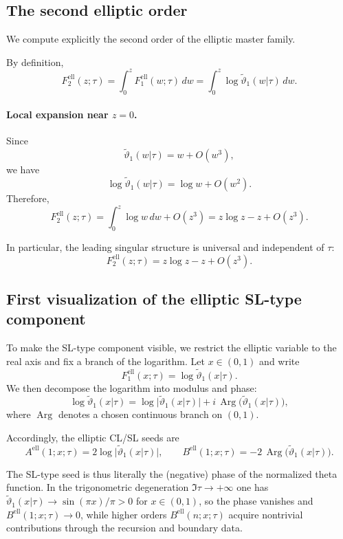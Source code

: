 \documentclass[11pt]{article}
\DeclareMathOperator{\Arg}{Arg}
\begin{document}
\subsection{The second elliptic order}

We compute explicitly the second order of the elliptic master family.

By definition,
\[
F^{\mathrm{ell}}_2(z;\tau)
=
\int_0^z F^{\mathrm{ell}}_1(w;\tau)\,dw
=
\int_0^z \log \widetilde{\vartheta}_1(w|\tau)\,dw.
\]

\paragraph{Local expansion near $z=0$.}
Since
\[
\widetilde{\vartheta}_1(w|\tau)
=
w + O(w^3),
\]
we have
\[
\log \widetilde{\vartheta}_1(w|\tau)
=
\log w + O(w^2).
\]
Therefore,
\[
F^{\mathrm{ell}}_2(z;\tau)
=
\int_0^z \log w\,dw + O(z^3)
=
z\log z - z + O(z^3).
\]

In particular, the leading singular structure is universal
and independent of $\tau$:
\[
F^{\mathrm{ell}}_2(z;\tau)
=
z\log z - z + O(z^3).
\]


\subsection{First visualization of the elliptic SL-type component}

To make the SL-type component visible, we restrict the elliptic variable to the
real axis and fix a branch of the logarithm.
Let $x\in(0,1)$ and write
\[
F^{\mathrm{ell}}_1(x;\tau)=\log \widetilde{\vartheta}_1(x|\tau).
\]
We then decompose the logarithm into modulus and phase:
\begin{equation}\label{eq:log-mod-arg}
\log \widetilde{\vartheta}_1(x|\tau)
=
\log\bigl|\widetilde{\vartheta}_1(x|\tau)\bigr|
+
i\,\Arg\bigl(\widetilde{\vartheta}_1(x|\tau)\bigr),
\end{equation}
where $\Arg$ denotes a chosen continuous branch on $(0,1)$.

Accordingly, the elliptic CL/SL seeds are
\begin{equation}\label{eq:ell-seed-CLSL}
A^{\mathrm{ell}}(1;x;\tau)=2\log\bigl|\widetilde{\vartheta}_1(x|\tau)\bigr|,
\qquad
B^{\mathrm{ell}}(1;x;\tau)=-2\,\Arg\bigl(\widetilde{\vartheta}_1(x|\tau)\bigr).
\end{equation}

The SL-type seed is thus literally the (negative) phase of the normalized theta function.
In the trigonometric degeneration $\Im\tau\to+\infty$ one has
$\widetilde{\vartheta}_1(x|\tau)\to \sin(\pi x)/\pi>0$ for $x\in(0,1)$,
so the phase vanishes and $B^{\mathrm{ell}}(1;x;\tau)\to 0$,
while higher orders $B^{\mathrm{ell}}(n;x;\tau)$ acquire nontrivial contributions
through the recursion and boundary data.
\end{document}
